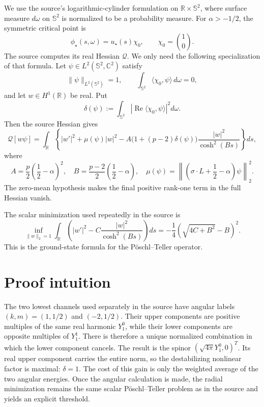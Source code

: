 \documentclass[11pt]{article}
\newcommand{\R}{\mathbb R}
\newcommand{\C}{\mathbb C}
\newcommand{\Sph}{\mathbb S^2}
\newcommand{\ip}[2]{\langle #1,#2\rangle}
\begin{document}
We use the source's logarithmic-cylinder formulation on
$\R\times\Sph$, where surface measure $d\omega$ on $\Sph$ is normalized to
be a probability measure.  For $\alpha>-1/2$, the symmetric critical point is
\[
 \phi_\star(s,\omega)=u_\star(s)\chi_0,
 \qquad \chi_0=\binom10.
\]
The source computes its real Hessian $\mathcal Q$.  We only need the following
specialization of that formula.  Let $\psi\in L^2(\Sph,\C^2)$ satisfy
\[
 \|\psi\|_{L^2(\Sph)}=1,
 \qquad \int_{\Sph}\ip{\chi_0}{\psi}\,d\omega=0,
\]
and let $w\in H^1(\R)$ be real.  Put
\[
 \delta(\psi):=\int_{\Sph}
 \left|\operatorname{Re}\ip{\chi_0}{\psi}\right|^2d\omega.
\]
Then the source Hessian gives
\begin{equation}\label{eq:reducedQ}
 \mathcal Q[w\psi]
 =\int_\R\left\{|w'|^2+\mu(\psi)|w|^2
 -A\bigl(1+(p-2)\delta(\psi)\bigr)
 \frac{|w|^2}{\cosh^2(Bs)}\right\}ds,
\end{equation}
where
\begin{equation}\label{eq:ABmu}
 A=\frac p2\left(\frac12-\alpha\right)^2,
 \quad
 B=\frac{p-2}{2}\left(\frac12-\alpha\right),
 \quad
 \mu(\psi)=\left\|\left(\sigma\!\cdot\!L+\frac12-\alpha\right)
 \psi\right\|_2^2.
\end{equation}
The zero-mean hypothesis makes the final positive rank-one term in the full
Hessian vanish.

The scalar minimization used repeatedly in the source is
\begin{equation}\label{eq:PT}
 \inf_{\|w\|_2=1}\int_\R
 \left(|w'|^2-C\frac{|w|^2}{\cosh^2(Bs)}\right)ds
 =-\frac14\left(\sqrt{4C+B^2}-B\right)^2.
\end{equation}
This is the ground-state formula for the P\"oschl--Teller operator.

\section{Proof intuition}

The two lowest channels used separately in the source have angular labels
$(k,m)=(1,1/2)$ and $(-2,1/2)$.  Their upper components are positive multiples
of the same real harmonic $Y_1^0$, while their lower components are opposite
multiples of $Y_1^1$.  There is therefore a unique normalized combination in
which the lower component cancels.  The result is the spinor
$(\sqrt{4\pi}Y_1^0,0)^T$.  Its real upper component carries the entire norm,
so the destabilizing nonlinear factor is maximal: $\delta=1$.  The cost of
this gain is only the weighted average of the two angular energies.  Once the
angular calculation is made, the radial minimization remains the same scalar
P\"oschl--Teller problem as in the source and yields an explicit threshold.
\end{document}
